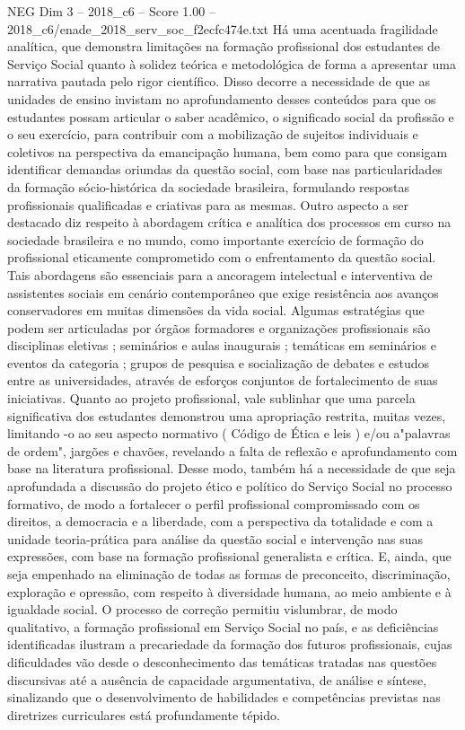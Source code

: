 \begin{textsample}{NEG Dim 3 – 2018\_c6 – Score 1.00 – 2018\_c6/enade\_2018\_serv\_soc\_f2ecfc474e.txt}
Há uma acentuada fragilidade analítica, que demonstra limitações na formação profissional dos estudantes de Serviço Social quanto à solidez teórica e metodológica de forma a apresentar uma narrativa pautada pelo rigor científico.
Disso decorre a necessidade de que as unidades de ensino invistam no aprofundamento desses conteúdos para que os estudantes possam articular o saber acadêmico, o significado social da profissão e o seu exercício, para contribuir com a mobilização de sujeitos individuais e coletivos na perspectiva da emancipação humana, bem como para que consigam identificar demandas oriundas da questão social, com base nas particularidades da formação sócio-histórica da sociedade brasileira, formulando respostas profissionais qualificadas e criativas para as mesmas.
Outro aspecto a ser destacado diz respeito à abordagem crítica e analítica dos processos em curso na sociedade brasileira e no mundo, como importante exercício de formação do profissional eticamente comprometido com o enfrentamento da questão social.
Tais abordagens são essenciais para a ancoragem intelectual e interventiva de assistentes sociais em cenário contemporâneo que exige resistência aos avanços conservadores em muitas dimensões da vida social.
Algumas estratégias que podem ser articuladas por órgãos formadores e organizações profissionais são disciplinas eletivas ; seminários e aulas inaugurais ; temáticas em seminários e eventos da categoria ; grupos de pesquisa e socialização de debates e estudos entre as universidades, através de esforços conjuntos de fortalecimento de suas iniciativas.
Quanto ao projeto profissional, vale sublinhar que uma parcela significativa dos estudantes demonstrou uma apropriação restrita, muitas vezes, limitando -o ao seu aspecto normativo ( Código de Ética e leis ) e/ou a"palavras de ordem", jargões e chavões, revelando a falta de reflexão e aprofundamento com base na literatura profissional.
Desse modo, também há a necessidade de que seja aprofundada a discussão do projeto ético e político do Serviço Social no processo formativo, de modo a fortalecer o perfil profissional compromissado com os direitos, a democracia e a liberdade, com a perspectiva da totalidade e com a unidade teoria-prática para análise da questão social e intervenção nas suas expressões, com base na formação profissional generalista e crítica.
E, ainda, que seja empenhado na eliminação de todas as formas de preconceito, discriminação, exploração e opressão, com respeito à diversidade humana, ao meio ambiente e à igualdade social.
O processo de correção permitiu vislumbrar, de modo qualitativo, a formação profissional em Serviço Social no país, e as deficiências identificadas ilustram a precariedade da formação dos futuros profissionais, cujas dificuldades vão desde o desconhecimento das temáticas tratadas nas questões discursivas até a ausência de capacidade argumentativa, de análise e síntese, sinalizando que o desenvolvimento de habilidades e competências previstas nas diretrizes curriculares está profundamente tépido.

\end{textsample}
